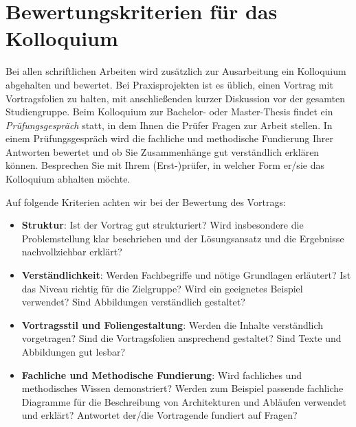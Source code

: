 \section{Bewertungskriterien für das Kolloquium}
\label{sec:bewertung-kolloquium}

Bei allen schriftlichen Arbeiten wird zusätzlich zur Ausarbeitung ein Kolloquium abgehalten und bewertet. Bei Praxisprojekten ist es üblich, einen Vortrag mit Vortragsfolien zu halten, mit anschließenden kurzer Diskussion vor der gesamten Studiengruppe. Beim Kolloquium zur Bachelor- oder Master-Thesis findet ein \textit{Prüfungsgespräch} statt, in dem Ihnen die Prüfer Fragen zur Arbeit stellen. In einem Prüfungsgespräch wird die fachliche und methodische Fundierung Ihrer Antworten bewertet und ob Sie Zusammenhänge gut verständlich erklären können. Besprechen Sie mit Ihrem (Erst-)prüfer, in welcher Form er/sie das Kolloquium abhalten möchte.

Auf folgende Kriterien achten wir bei der Bewertung des Vortrags:

    \begin{itemize}

	    \item \textbf{Struktur}: Ist der Vortrag gut strukturiert? Wird insbesondere die Problemstellung klar beschrieben und der Lösungsansatz und die Ergebnisse nachvollziehbar erklärt?
	    
	    \item \textbf{Verständlichkeit}: Werden Fachbegriffe und nötige Grundlagen erläutert? Ist das Niveau richtig für die Zielgruppe? Wird ein geeignetes Beispiel verwendet? Sind Abbildungen verständlich gestaltet?
	    
    	\item \textbf{Vortragsstil und Foliengestaltung}: Werden die Inhalte verständlich vorgetragen? Sind die Vortragsfolien ansprechend gestaltet? Sind Texte und Abbildungen gut lesbar?
    	
    	\item \textbf{Fachliche und Methodische Fundierung}: Wird fachliches und methodisches Wissen demonstriert? Werden zum Beispiel  passende fachliche Diagramme für die Beschreibung von Architekturen und Abläufen verwendet und erklärt? Antwortet der/die Vortragende fundiert auf Fragen?
	
    \end{itemize}
    